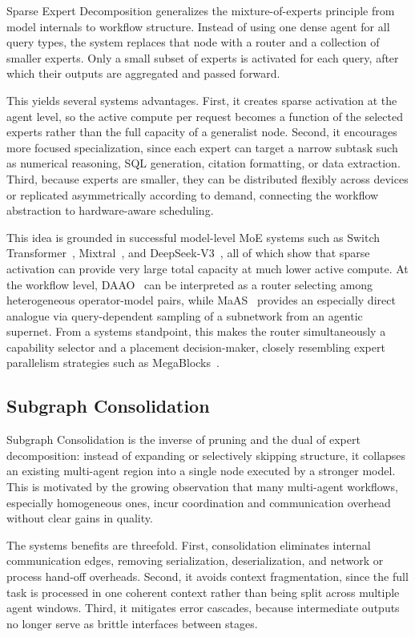 Sparse Expert Decomposition generalizes the mixture-of-experts principle from model internals to workflow structure. Instead of using one dense agent for all query types, the system replaces that node with a router and a collection of smaller experts. Only a small subset of experts is activated for each query, after which their outputs are aggregated and passed forward.

This yields several systems advantages. First, it creates sparse activation at the agent level, so the active compute per request becomes a function of the selected experts rather than the full capacity of a generalist node. Second, it encourages more focused specialization, since each expert can target a narrow subtask such as numerical reasoning, SQL generation, citation formatting, or data extraction. Third, because experts are smaller, they can be distributed flexibly across devices or replicated asymmetrically according to demand, connecting the workflow abstraction to hardware-aware scheduling.

This idea is grounded in successful model-level MoE systems such as Switch Transformer~\citep{fedus2022switch}, Mixtral~\citep{jiang2024mixtral}, and DeepSeek-V3~\citep{deepseekai2025deepseekv3}, all of which show that sparse activation can provide very large total capacity at much lower active compute. At the workflow level, DAAO~\citep{daao2025} can be interpreted as a router selecting among heterogeneous operator-model pairs, while MaAS~\citep{zhang2025maas} provides an especially direct analogue via query-dependent sampling of a subnetwork from an agentic supernet. From a systems standpoint, this makes the router simultaneously a capability selector and a placement decision-maker, closely resembling expert parallelism strategies such as MegaBlocks~\citep{gale2023megablocks}.

\subsection{Subgraph Consolidation}

Subgraph Consolidation is the inverse of pruning and the dual of expert decomposition: instead of expanding or selectively skipping structure, it collapses an existing multi-agent region into a single node executed by a stronger model. This is motivated by the growing observation that many multi-agent workflows, especially homogeneous ones, incur coordination and communication overhead without clear gains in quality.

The systems benefits are threefold. First, consolidation eliminates internal communication edges, removing serialization, deserialization, and network or process hand-off overheads. Second, it avoids context fragmentation, since the full task is processed in one coherent context rather than being split across multiple agent windows. Third, it mitigates error cascades, because intermediate outputs no longer serve as brittle interfaces between stages.

